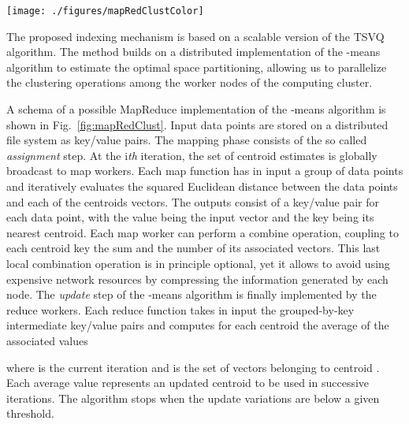 \begin{figure*}[t]
	\centering
\texttt{[image: ./figures/mapRedClustColor]}
	\caption{General MapReduce implementation of the \mbox{-means} algorithm. The assignment and the update step can be implemented by a sequence of map\&combine and reduce phases. Tile descriptors stored in a distributed storage system are given as input to mappers together with the current centroids estimates. Each mapper performs the assignment step, putting out a key/value pair for each input vector, with the value being the input vector and the key being its nearest centroid. A combiner performs then a group-by-key, coupling to each centroid-key the sum and the number of its associated vectors. Reducers finally aggregate the sets of key/value pair to provide updated estimates of centroids.}
	\label{fig:mapRedClust}
\end{figure*}


The proposed indexing mechanism is based on a scalable version of the TSVQ algorithm. 
The method builds on a distributed implementation of the \mbox{-means} algorithm to estimate the optimal space partitioning, allowing us to parallelize the clustering operations among the worker nodes of the computing cluster. 


A schema of a possible MapReduce implementation of the \mbox{-means} algorithm is shown in Fig.~\ref{fig:mapRedClust}. 
Input data points are stored on a distributed file system as key/value pairs. 
The mapping phase consists of the so called \emph{assignment} step. 
At the i\emph{th} iteration, the set of  centroid estimates  is globally broadcast to map workers. 
Each map function has in input a group of data points and iteratively evaluates the squared Euclidean distance between the data points and each of the centroids vectors. 
The outputs consist of a key/value pair for each data point, with the value being the input vector and the key being its nearest centroid. 
Each map worker can perform a combine operation, coupling to each centroid key the sum and the number of its associated vectors.
This last local combination operation is in principle optional, yet it allows to avoid using expensive network resources by compressing the information generated by each node.
The \emph{update} step of the \mbox{-means} algorithm is finally implemented by the reduce workers. 
Each reduce function takes in input the grouped-by-key intermediate key/value pairs and computes for each centroid the average of the associated values

where  is the current iteration and  is the set of vectors belonging to centroid .
Each average value represents an updated centroid to be used in successive iterations. 
The algorithm stops when the update variations are below a given threshold.

